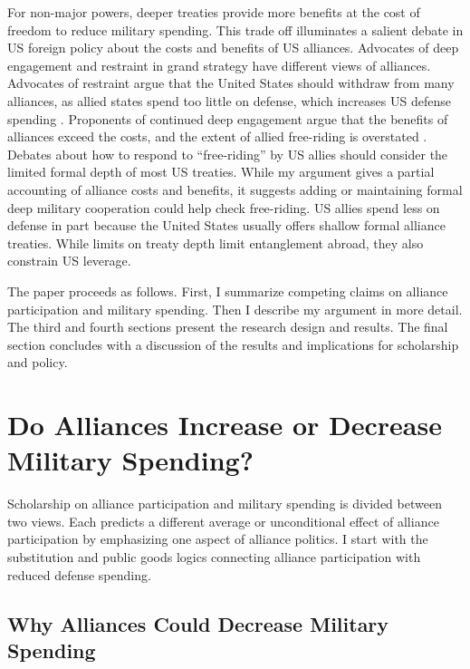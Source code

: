 \documentclass[12pt]{article}
\begin{document}
For non-major powers, deeper treaties provide more benefits at the cost of freedom to reduce military spending. 
This trade off illuminates a salient debate in US foreign policy about the costs and benefits of US alliances.
Advocates of deep engagement \citep{Brooksetal2013} and restraint \citep{Posen2014} in grand strategy have different views of alliances. 
Advocates of restraint argue that the United States should withdraw from many alliances, as allied states spend too little on defense, which increases US defense spending \citep{Preble2009}.
Proponents of continued deep engagement argue that the benefits of alliances exceed the costs, and the extent of allied free-riding is overstated \citep{BrandsFeaver2017}. 
Debates about how to respond to ``free-riding'' by US allies should consider the limited formal depth of most US treaties.
While my argument gives a partial accounting of alliance costs and benefits, it suggests adding or maintaining formal deep military cooperation could help check free-riding.   
US allies spend less on defense in part because the United States usually offers shallow formal alliance treaties. 
While limits on treaty depth limit entanglement abroad, they also constrain US leverage. 


The paper proceeds as follows. 
First, I summarize competing claims on alliance participation and military spending. 
Then I describe my argument in more detail. 
The third and fourth sections present the research design and results. 
The final section concludes with a discussion of the results and implications for scholarship and policy.  



\section{Do Alliances Increase or Decrease Military Spending?}


Scholarship on alliance participation and military spending is divided between two views.
Each predicts a different average or unconditional effect of alliance participation by emphasizing one aspect of alliance politics.  
I start with the substitution and public goods logics connecting alliance participation with reduced defense spending. 


\subsection{Why Alliances Could Decrease Military Spending} 
\end{document}
